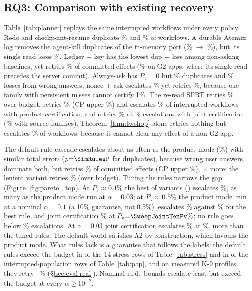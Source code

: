 \subsection{RQ3: Comparison with existing recovery}
\label{sec:eval-e2e}
Table~\ref{tab:planner} replays the same \SimN interrupted workflows under every policy. Redo and checkpoint-resume duplicate \SimRedoDup\% and \SimCkptDup\% of workflows.
A durable Atomix log removes the agent-kill duplicates of the in-memory port (\SimAtomixDup\% $\to$ \SimAtomixDurDup\%), but its single read loses \SimAtomixDurLoss\%. Ledger + key has
the lowest dup + loss among non-asking baselines, yet retries \SimKeyPv\% of committed effects (\ClassKeyGtwoPv\% on G2 apps, where its single read precedes the server commit).
Always-ask has $P_{\mathrm{v}}{=}0$ but \SimAskAllDup\% duplicates and \SimAskAllLoss\% losses from wrong answers; nonce + ask escalates \SimNonceAskAsk\% yet retries \SimNonceAskPv\%,
because one family with persistent misses cannot certify 1\%. The re-read SPRT retries \SimVonePv\%, over budget. \sys retries \SimGhostPv\% (CP upper \SimGhostPvHi\%) and escalates \SimGhostAsk\% of interrupted workflows with product certification, and retries
\SimJointPv\% at \SimJointAsk\% escalations with joint certification (\SimSrcAsk\% with source families). Theorem~\ref{thm:twohop} alone retries nothing but escalates
\SimGtwoAsk\% of workflows, because it cannot clear any effect of a non-G2 app.

 The default rule cascade escalates about as often as the product mode (\SimRulesAsk\%) with similar total errors
($p{=}\SimRulesP$ for duplicates), because wrong user answers dominate both, but retries \SimRulesPv\% of committed effects (CP upper \SimRulesPvHi\%), \SimRulesRatio$\times$
more; the lenient variant retries \SimRulesLenPv\% (over budget). Tuning the rules narrows the gap (Figure~\ref{fig:pareto}, top). At $P_{\mathrm{v}}\approx0.1\%$ the best of
\RuleN{} variants (\RuleBestThreeName) escalates \RuleBestThreeAsk\%, as many as the product mode run at $\alpha{=}0.03$; at $P_{\mathrm{v}}\approx0.5\%$ the product mode, run at a
nominal $\alpha{=}0.1$ (a 10\% guarantee, not 0.5\%), escalates \SweepTenAsk\% against \RuleBestTenAsk\% for the best rule, and joint certification \SweepJointTenAsk\% at
$P_{\mathrm{v}}{=}\SweepJointTenPv\%$; no rule goes below \RuleMinAsk\% escalations. At $\alpha{=}0.03$ joint certification escalates \SweepJointThreeAsk\% at \SweepJointThreePv\%,
more than the tuned rules. The default world satisfies A2 by construction, which favours the product mode. What rules lack is a guarantee that follows the labels: the default
rules exceed the budget in \StressRulesOver{} of the 14 stress rows of Table~\ref{tab:stress} and in \PopRulesOver{} of the \PopRows{} interrupted-population rows of Table~\ref{tab:pop},
and on measured K-9 profiles they retry \RsimKsentRulesPv--\RsimKnineRulesPv\% (\S\ref{sec:eval-real}). Nominal i.i.d.\ bounds escalate least but exceed the budget at every $\alpha\ge10^{-2}$.

